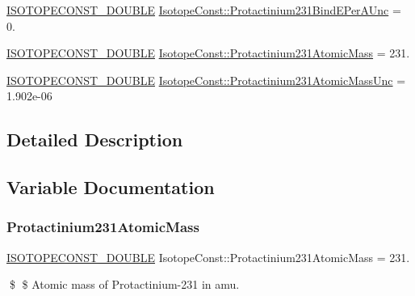\begin{DoxyCompactItemize}
\item 
\mbox{\hyperlink{group___isotope_const-_macros_ga8f45a7272ce02c0b4c65c44636ed719a}{I\+S\+O\+T\+O\+P\+E\+C\+O\+N\+S\+T\+\_\+\+D\+O\+U\+B\+LE}} \mbox{\hyperlink{group___isotope_const-_protactinium-_pa231_ga71595bab9d5b3e7124024fef34e2f8dc}{Isotope\+Const\+::\+Protactinium231\+Bind\+E\+Per\+A\+Unc}} = 0.
\item 
\mbox{\hyperlink{group___isotope_const-_macros_ga8f45a7272ce02c0b4c65c44636ed719a}{I\+S\+O\+T\+O\+P\+E\+C\+O\+N\+S\+T\+\_\+\+D\+O\+U\+B\+LE}} \mbox{\hyperlink{group___isotope_const-_protactinium-_pa231_ga80a607232e5ba6ad7c255a0bd7542fde}{Isotope\+Const\+::\+Protactinium231\+Atomic\+Mass}} = 231.
\item 
\mbox{\hyperlink{group___isotope_const-_macros_ga8f45a7272ce02c0b4c65c44636ed719a}{I\+S\+O\+T\+O\+P\+E\+C\+O\+N\+S\+T\+\_\+\+D\+O\+U\+B\+LE}} \mbox{\hyperlink{group___isotope_const-_protactinium-_pa231_gac32ab53c64050390b5c995466b00fdaf}{Isotope\+Const\+::\+Protactinium231\+Atomic\+Mass\+Unc}} = 1.\+902e-\/06
\end{DoxyCompactItemize}


\subsection{Detailed Description}


\subsection{Variable Documentation}
\mbox{\label{group___isotope_const-_protactinium-_pa231_ga80a607232e5ba6ad7c255a0bd7542fde}} 
\subsubsection{\texorpdfstring{Protactinium231\+Atomic\+Mass}{Protactinium231AtomicMass}}
{\footnotesize\ttfamily \mbox{\hyperlink{group___isotope_const-_macros_ga8f45a7272ce02c0b4c65c44636ed719a}{I\+S\+O\+T\+O\+P\+E\+C\+O\+N\+S\+T\+\_\+\+D\+O\+U\+B\+LE}} Isotope\+Const\+::\+Protactinium231\+Atomic\+Mass = 231.}

\$ \$ Atomic mass of Protactinium-\/231 in amu. \mbox{\label{group___isotope_const-_protactinium-_pa231_gac32ab53c64050390b5c995466b00fdaf}} 
